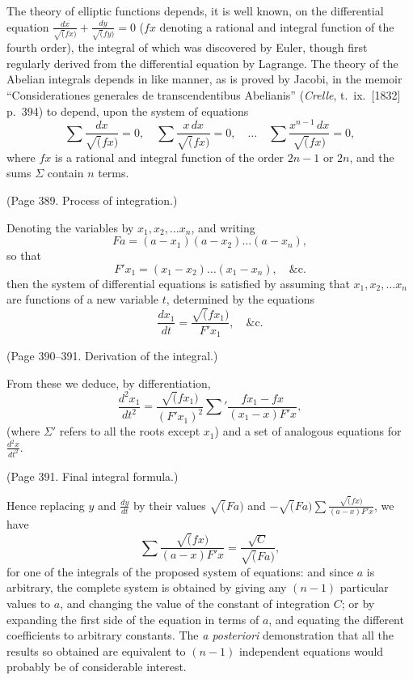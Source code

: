 \documentclass[11pt,a4paper]{book}
\begin{document}
The theory of elliptic functions depends, it is well known, on the differential
equation $\frac{dx}{\surd(fx)} + \frac{dy}{\surd(fy)} = 0$ ($fx$ denoting a rational and integral function
of the fourth order), the integral of which was discovered by Euler, though first regularly derived
from the differential equation by Lagrange. The theory of the Abelian integrals depends
in like manner, as is proved by Jacobi, in the memoir ``Considerationes generales
de transcendentibus Abelianis'' (\textit{Crelle}, t.~ix.\ [1832] p.~394) to depend, upon the system
of equations
\[
\sum \frac{dx}{\surd(fx)} = 0, \quad \sum \frac{x\,dx}{\surd(fx)} = 0, \quad \ldots \quad
\sum \frac{x^{n-1}\,dx}{\surd(fx)} = 0,
\]
where $fx$ is a rational and integral function of the order $2n-1$ or $2n$, and the sums
$\Sigma$ contain $n$ terms.

(Page 389. Process of integration.)

Denoting the variables by $x_1, x_2, \ldots x_n$, and writing
\[
Fa = (a - x_1)(a - x_2)\ldots(a - x_n),
\]
so that
\[
F'x_1 = (x_1 - x_2)\ldots(x_1 - x_n), \quad \&\text{c.}
\]
then the system of differential equations is satisfied by assuming that
$x_1, x_2, \ldots x_n$ are functions of a new variable $t$, determined by the equations
\[
\frac{dx_1}{dt} = \frac{\surd(fx_1)}{F'x_1}, \quad \&\text{c.}
\]

(Page 390--391. Derivation of the integral.)

From these we deduce, by differentiation,
\[
\frac{d^2x_1}{dt^2} = \frac{\surd(fx_1)}{(F'x_1)^2} \sum' \frac{fx_1 - fx}{(x_1 - x)F'x},
\]
(where $\Sigma'$ refers to all the roots except $x_1$) and a set of analogous equations for
$\frac{d^2x}{dt^2}$.

(Page 391. Final integral formula.)

Hence replacing $y$ and $\frac{dy}{dt}$ by their values
$\surd(Fa)$ and $-\surd(Fa) \sum \frac{\surd(fx)}{(a-x)F'x}$,
we have
\[
\sum \frac{\surd(fx)}{(a-x)F'x} = \frac{\sqrt{C}}{\surd(Fa)},
\]
for one of the integrals of the proposed system of equations: and since $a$ is arbitrary,
the complete system is obtained by giving any $(n-1)$ particular values to $a$, and
changing the value of the constant of integration $C$; or by expanding the first side
of the equation in terms of $a$, and equating the different coefficients to arbitrary
constants. The \textit{a posteriori} demonstration that all the results so obtained are equivalent
to $(n-1)$ independent equations would probably be of considerable interest.
\end{document}
